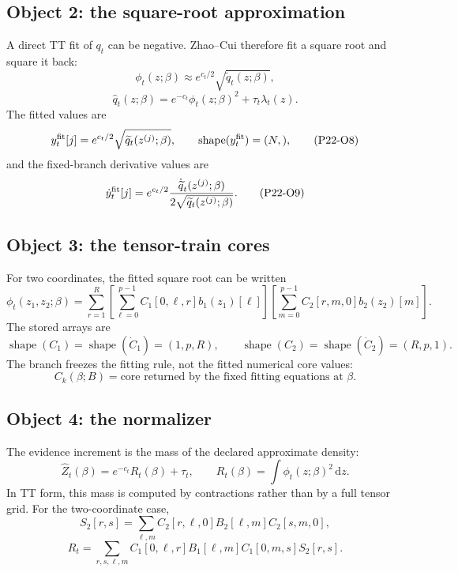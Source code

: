 \documentclass[11pt]{article}
\newcommand{\dd}{\,\mathrm d}
\newcommand{\shape}{\operatorname{shape}}
\begin{document}
\subsection*{Object 2: the square-root approximation}

A direct TT fit of \(q_t\) can be negative.  Zhao--Cui therefore fit a square
root and square it back:
\[
    \phi_t(z;\beta)\approx e^{c_t/2}\sqrt{\widetilde q_t(z;\beta)},
    \tag{P22-O6}
\]
\[
    \widehat q_t(z;\beta)
    =
    e^{-c_t}\phi_t(z;\beta)^2+\tau_t\lambda_t(z).
    \tag{P22-O7}
\]
The fitted values are
\[
    y_t^{\rm fit}[j]
    =
    e^{c_t/2}\sqrt{\widetilde q_t(z^{(j)};\beta)},
    \qquad
    \shape(y_t^{\rm fit})=(N,),
    \tag{P22-O8}
\]
and the fixed-branch derivative values are
\[
    \dot y_t^{\rm fit}[j]
    =
    e^{c_t/2}
    \frac{\dot{\widetilde q}_t(z^{(j)};\beta)}
    {2\sqrt{\widetilde q_t(z^{(j)};\beta)}}.
    \tag{P22-O9}
\]

\subsection*{Object 3: the tensor-train cores}

For two coordinates, the fitted square root can be written
\[
    \phi_t(z_1,z_2;\beta)
    =
    \sum_{r=1}^{R}
    \left[
    \sum_{\ell=0}^{p-1}C_1[0,\ell,r]b_1(z_1)[\ell]
    \right]
    \left[
    \sum_{m=0}^{p-1}C_2[r,m,0]b_2(z_2)[m]
    \right].
    \tag{P22-O10}
\]
The stored arrays are
\[
    \shape(C_1)=\shape(\dot C_1)=(1,p,R),
    \qquad
    \shape(C_2)=\shape(\dot C_2)=(R,p,1).
    \tag{P22-O11}
\]
The branch freezes the fitting rule, not the fitted numerical core values:
\[
    C_k(\beta;B)
    =
    \text{core returned by the fixed fitting equations at }\beta.
    \tag{P22-O12}
\]

\subsection*{Object 4: the normalizer}

The evidence increment is the mass of the declared approximate density:
\[
    \widehat Z_t(\beta)
    =
    e^{-c_t}R_t(\beta)+\tau_t,
    \qquad
    R_t(\beta)=\int\phi_t(z;\beta)^2\dd z.
    \tag{P22-O13}
\]
In TT form, this mass is computed by contractions rather than by a full tensor
grid.  For the two-coordinate case,
\[
    S_2[r,s]
    =
    \sum_{\ell,m}
    C_2[r,\ell,0]B_2[\ell,m]C_2[s,m,0],
    \tag{P22-O14}
\]
\[
    R_t
    =
    \sum_{r,s,\ell,m}
    C_1[0,\ell,r]B_1[\ell,m]C_1[0,m,s]S_2[r,s].
    \tag{P22-O15}
\]
\end{document}
